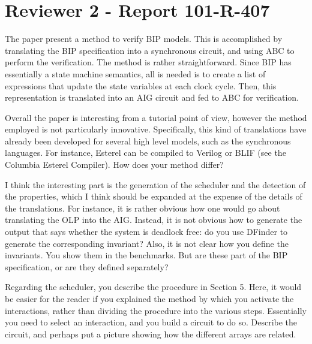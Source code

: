 \section{Reviewer 2 - Report 101-R-407}
%
%
The paper present a method to verify BIP models. This is accomplished by
translating the BIP specification into a synchronous circuit, and using ABC to
perform the verification. The method is rather straightforward. Since BIP has
essentially a state machine semantics, all is needed is to create a list of
expressions that update the state variables at each clock cycle. Then, this
representation is translated into an AIG circuit and fed to ABC for
verification.

Overall the paper is interesting from a tutorial point of view, however the
method employed is not particularly innovative. Specifically, this kind of
translations have already been developed for several high level models, such
as the synchronous languages. For instance, Esterel can be compiled to Verilog
or BLIF (see the Columbia Esterel Compiler). How does your method differ?


I think the interesting part is the generation of the scheduler and the
detection of the properties, which I think should be expanded at the expense
of the details of the translations. For instance, it is rather obvious how one
would go about translating the OLP into the AIG. Instead, it is not obvious
how to generate the output that says whether the system is deadlock free: do
you use DFinder to generate the corresponding invariant? Also, it is not clear
how you define the invariants. You show them in the benchmarks. But are these
part of the BIP specification, or are they defined separately?

\done
{}


Regarding the scheduler, you describe the procedure in Section 5. Here, it
would be easier for the reader if you explained the method by which you
activate the interactions, rather than dividing the procedure into the various
steps. Essentially you need to select an interaction, and you build a circuit
to do so. Describe the circuit, and perhaps put a picture showing how the
different arrays are related.



